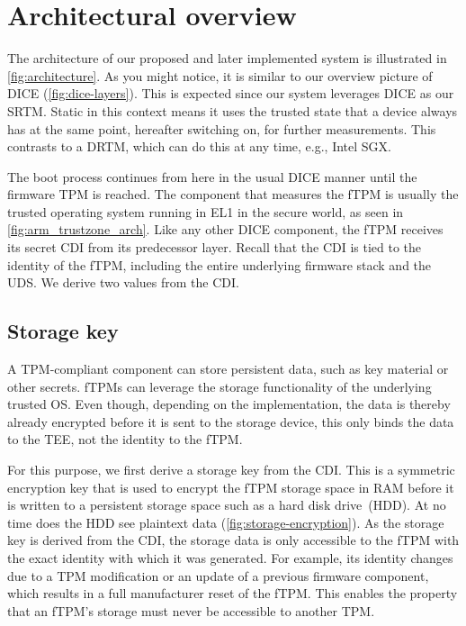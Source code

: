 

\section{Architectural overview}\label{sec:arch_overview}



The architecture of our proposed and later implemented system is illustrated in \autoref{fig:architecture}.
As you might notice, it is similar to our overview picture of \ac{DICE} (\autoref{fig:dice-layers}).
This is expected since our system leverages \ac{DICE} as our \ac{SRTM}.
Static in this context means it uses the trusted state that a device always has at the same point, hereafter switching on, for further measurements.
This contrasts to a \ac{DRTM}, which can do this at any time, e.g., Intel SGX\@.

The boot process continues from here in the usual \ac{DICE} manner until the firmware TPM is reached.
The component that measures the \ac{fTPM} is usually the trusted operating system running in EL1 in the secure world, as seen in \autoref{fig:arm_trustzone_arch}.
Like any other \ac{DICE} component, the \ac{fTPM} receives its secret \ac{CDI} from its predecessor layer.
Recall that the \ac{CDI} is tied to the identity of the \ac{fTPM}, including the entire underlying firmware stack and the \ac{UDS}\@.
We derive two values from the \ac{CDI}\@.

\subsection{Storage key}


A TPM-compliant component can store persistent data, such as key material or other secrets.
\Acp{fTPM} can leverage the storage functionality of the underlying trusted OS\@.
Even though, depending on the implementation, the data is thereby already encrypted before it is sent to the storage device, this only binds the data to the \ac{TEE}, not the identity to the \ac{fTPM}.

For this purpose, we first derive a storage key from the \ac{CDI}.
This is a symmetric encryption key that is used to encrypt the \ac{fTPM} storage space in RAM before it is written to a persistent storage space such as a hard disk drive~(HDD).
At no time does the HDD see plaintext data (\autoref{fig:storage-encryption}).
As the storage key is derived from the \ac{CDI}, the storage data is only accessible to the \ac{fTPM} with the exact identity with which it was generated.
For example, its identity changes due to a \ac{TPM} modification or an update of a previous firmware component, which results in a full manufacturer reset of the fTPM\@.
This enables the property that an \ac{fTPM}'s storage must never be accessible to another \ac{TPM}\@.

